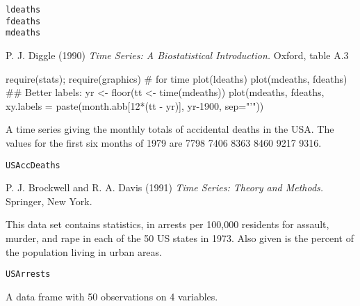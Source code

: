 %
\begin{Usage}
\begin{verbatim}
ldeaths
fdeaths
mdeaths
\end{verbatim}
\end{Usage}
%
\begin{Source}\relax
P. J. Diggle (1990)
\emph{Time Series: A Biostatistical Introduction.}
Oxford, table A.3
\end{Source}
%
\begin{Examples}
\begin{ExampleCode}
require(stats); require(graphics) # for time
plot(ldeaths) 
plot(mdeaths, fdeaths) 
## Better labels:
yr <- floor(tt <- time(mdeaths))
plot(mdeaths, fdeaths,
     xy.labels = paste(month.abb[12*(tt - yr)], yr-1900, sep="'"))
\end{ExampleCode}
\end{Examples}
%
\begin{Description}\relax
A time series giving the monthly totals of accidental deaths in the
USA.  The values for the first six months of 1979 are 7798 7406 8363
8460 9217 9316.
\end{Description}
%
\begin{Usage}
\begin{verbatim}
USAccDeaths
\end{verbatim}
\end{Usage}
%
\begin{Source}\relax
P. J. Brockwell and R. A. Davis (1991)
\emph{Time Series: Theory and Methods.}
Springer, New York.
\end{Source}
%
\begin{Description}\relax
This data set contains statistics, in arrests per 100,000 residents
for assault, murder, and rape in each of the 50 US states in 1973.
Also given is the percent of the population living in urban areas.
\end{Description}
%
\begin{Usage}
\begin{verbatim}
USArrests
\end{verbatim}
\end{Usage}
%
\begin{Format}
A data frame with 50 observations on 4 variables.


\end{Format}

